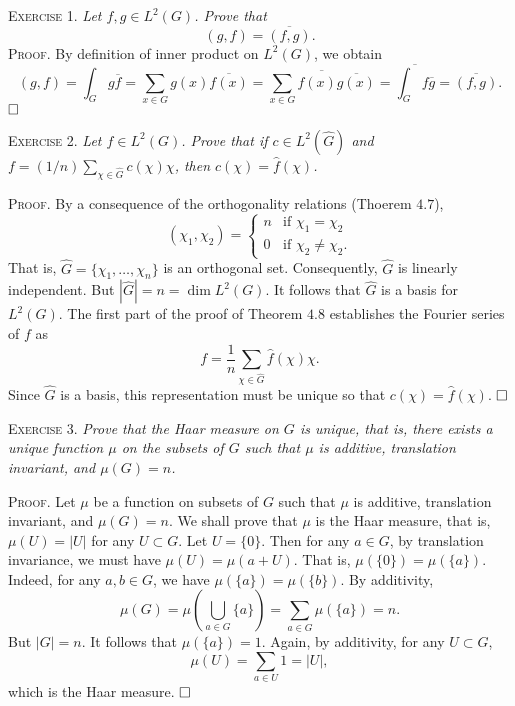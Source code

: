 \documentclass[11pt, leqno]{article}
\newcommand{\done}{\ensuremath{\hfill\square}}
\begin{document}
\textsc{Exercise 1}. \emph{Let $f,g \in L^2(G)$. Prove that 
\begin{displaymath}
(g,f) = \overline{(f,g)}.
\end{displaymath}}\textsc{Proof}. By definition of inner product on $L^2(G)$, we obtain 
\begin{displaymath}
  (g, f) = \int_G g\overline{f} = \sum_{x\in G} g(x) \overline{f(x)} = \overline{\sum_{x\in G} f(x) \overline{g(x)}} = \overline{\int_G f\overline{g}} = \overline{(f,g)}.
\end{displaymath}\done

\textsc{Exercise 2}. \emph{Let $f \in L^2(G)$. Prove that if $c\in L^2(\widehat{G})$ and $f=(1/n)\sum_{\chi \in \widehat{G}} c(\chi) \chi$, then $c(\chi) = \widehat{f}(\chi)$.}

\textsc{Proof}. By a consequence of the orthogonality relations (Thoerem $4.7$), 
\begin{displaymath}
(\chi_1, \chi_2) =
\begin{cases}
  n & \text{if } \chi_1 = \chi_2 \\
  0 & \text{if } \chi_2 \ne \chi_2.
\end{cases}
\end{displaymath}
That is, $\widehat{G} = \{\chi_1, \ldots, \chi_n\}$ is an orthogonal set. Consequently, $\widehat{G}$ is linearly independent. But $|\widehat{G}| = n = \dim L^2(G)$. It follows that $\widehat{G}$ is a basis for $L^2(G)$. The first part of the proof of Theorem $4.8$ establishes the Fourier series of $f$ as 
\begin{displaymath}
f = \frac{1}{n} \sum_{\chi \in \widehat{G}} \widehat{f}(\chi) \chi.
\end{displaymath}
Since $\widehat{G}$ is a basis, this representation must be unique so that $c(\chi) = \widehat{f}(\chi)$. \done

\textsc{Exercise 3}. \emph{Prove that the Haar measure on $G$ is unique, that is, there exists a unique function $\mu$ on the subsets of $G$ such that $\mu$ is additive, translation invariant, and $\mu (G) = n$.}

\textsc{Proof}. Let $\mu$ be a function on subsets of $G$ such that $\mu$ is additive, translation invariant, and $\mu(G) = n$. We shall prove that $\mu$ is the Haar measure, that is, $\mu(U) = |U|$ for any $U \subset G$. Let $U = \{0\}$. Then for any $a \in G$, by translation invariance, we must have $\mu(U) = \mu(a + U)$. That is, $\mu(\{0\}) = \mu(\{a\})$. Indeed, for any $a, b\in G$, we have $\mu(\{a\}) = \mu(\{b\})$. By additivity, 
\begin{displaymath}
\mu(G) = \mu(\bigcup_{a\in G} \{a\}) = \sum_{a\in G} \mu(\{a\}) = n.
\end{displaymath}
But $|G| = n$. It follows that $\mu(\{a\}) = 1$. Again, by additivity, for any $U \subset G$, 
\begin{displaymath}
\mu(U) = \sum_{a\in U} 1 = |U|,
\end{displaymath}
which is the Haar measure. \done
\end{document}
